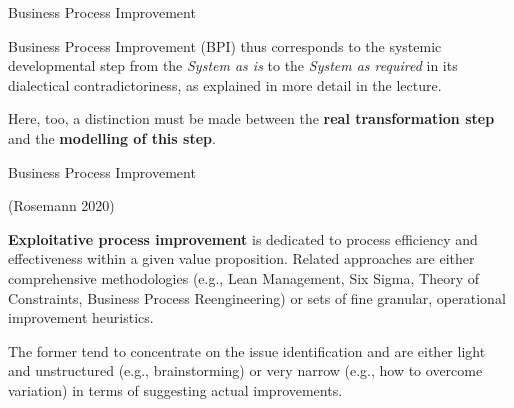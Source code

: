 \documentclass{beamer}
\begin{document}

\begin{frame}{Business Process Improvement}

  Business Process Improvement (BPI) thus corresponds to the systemic
  developmental step from the \emph{System as is} to the \emph{System as
    required} in its dialectical contradictoriness, as explained in more
  detail in the lecture.

  Here, too, a distinction must be made between the \textbf{real
    transformation step} and the \textbf{modelling of this step}.

\end{frame}

\begin{frame}{Business Process Improvement}

  (Rosemann 2020)

  \textbf{Exploitative process improvement} is dedicated to process efficiency
  and effectiveness within a given value proposition. Related approaches are
  either comprehensive methodologies (e.g., Lean Management, Six Sigma, Theory
  of Constraints, Business Process Reengineering) or sets of fine granular,
  operational improvement heuristics.

  The former tend to concentrate on the issue identification and are either
  light and unstructured (e.g., brainstorming) or very narrow (e.g., how to
  overcome variation) in terms of suggesting actual improvements.
\end{frame}
\end{document}
